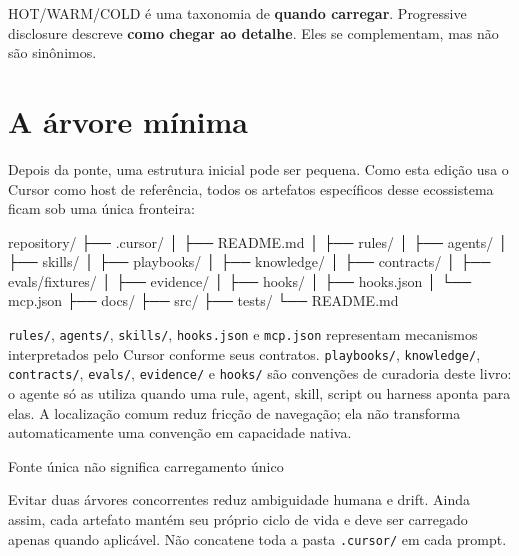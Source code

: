 \documentclass[
  10pt,
  a4paper,
  oneside]{book}
\newenvironment{Shaded}{}{}
\newcommand{\NormalTok}[1]{#1}
\begin{document}
HOT/WARM/COLD é uma taxonomia de \textbf{quando carregar}. Progressive
disclosure descreve \textbf{como chegar ao detalhe}. Eles se
complementam, mas não são sinônimos.

\hypertarget{a-uxe1rvore-muxednima}{%
\section{A árvore mínima}\label{a-uxe1rvore-muxednima}}

Depois da ponte, uma estrutura inicial pode ser pequena. Como esta
edição usa o Cursor como host de referência, todos os artefatos
específicos desse ecossistema ficam sob uma única fronteira:

\begin{Shaded}
\begin{Highlighting}[]
\NormalTok{repository/}
\NormalTok{├── .cursor/}
\NormalTok{│   ├── README.md}
\NormalTok{│   ├── rules/}
\NormalTok{│   ├── agents/}
\NormalTok{│   ├── skills/}
\NormalTok{│   ├── playbooks/}
\NormalTok{│   ├── knowledge/}
\NormalTok{│   ├── contracts/}
\NormalTok{│   ├── evals/fixtures/}
\NormalTok{│   ├── evidence/}
\NormalTok{│   ├── hooks/}
\NormalTok{│   ├── hooks.json}
\NormalTok{│   └── mcp.json}
\NormalTok{├── docs/}
\NormalTok{├── src/}
\NormalTok{├── tests/}
\NormalTok{└── README.md}
\end{Highlighting}
\end{Shaded}

\texttt{rules/}, \texttt{agents/}, \texttt{skills/}, \texttt{hooks.json}
e \texttt{mcp.json} representam mecanismos interpretados pelo Cursor
conforme seus contratos. \texttt{playbooks/}, \texttt{knowledge/},
\texttt{contracts/}, \texttt{evals/}, \texttt{evidence/} e
\texttt{hooks/} são convenções de curadoria deste livro: o agente só as
utiliza quando uma rule, agent, skill, script ou harness aponta para
elas. A localização comum reduz fricção de navegação; ela não transforma
automaticamente uma convenção em capacidade nativa.

\begin{warningbox}{Fonte única não significa carregamento único}

Evitar duas árvores concorrentes reduz ambiguidade humana e drift. Ainda
assim, cada artefato mantém seu próprio ciclo de vida e deve ser
carregado apenas quando aplicável. Não concatene toda a pasta
\texttt{.cursor/} em cada prompt.

\end{warningbox}
\end{document}
